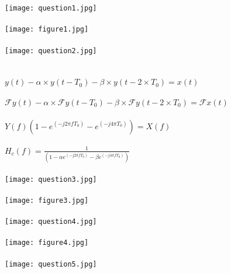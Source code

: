 \documentclass{article}
\begin{document}
\texttt{[image: question1.jpg]}\\\\
\texttt{[image: figure1.jpg]}\\\\
\texttt{[image: question2.jpg]}\\\\\\
$y(t) - \alpha\times y(t - T_0) - \beta\times y(t - 2\times T_0) = x(t)$\\\\
$\mathcal{F}y(t) - \alpha\times\mathcal{F}y(t - T_0) - \beta\times \mathcal{F}y(t - 2\times T_0)= \mathcal{F}x(t)$\\\\
$Y(f)(1 - e^(-j2\pi fT_0)-e^(-j4\pi T_0)) = X(f)$\\\\ 
$H_c(f) = \frac{1}{ (1 - \alpha e^(-j2\pi fT_0)-\beta e^(-j4\pi f T_0))}$ \\\\
\texttt{[image: question3.jpg]}\\\\
\texttt{[image: figure3.jpg]}\\\\
\texttt{[image: question4.jpg]}\\\\
\texttt{[image: figure4.jpg]}\\\\
\texttt{[image: question5.jpg]}\\\\
\end{document}

